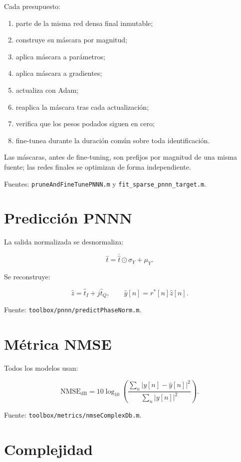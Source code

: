 \documentclass[10pt,a4paper]{article}
\newcommand{\code}[1]{\texttt{#1}}
\begin{document}
Cada presupuesto:

\begin{enumerate}[leftmargin=*]
\item parte de la misma red densa final inmutable;
\item construye su máscara por magnitud;
\item aplica máscara a parámetros;
\item aplica máscara a gradientes;
\item actualiza con Adam;
\item reaplica la máscara tras cada actualización;
\item verifica que los pesos podados siguen en cero;
\item fine-tunea durante la duración común sobre toda identificación.
\end{enumerate}

Las máscaras, antes de fine-tuning, son prefijos por magnitud de una misma
fuente; las redes finales se optimizan de forma independiente.

Fuentes:
\code{pruneAndFineTunePNNN.m} y
\code{fit\_sparse\_pnnn\_target.m}.

\section{Predicción PNNN}

La salida normalizada se desnormaliza:

\[
\hat t=\bar{\hat t}\odot\sigma_Y+\mu_Y.
\]

Se reconstruye:

\[
\hat z=\hat t_I+j\hat t_Q,
\qquad
\hat y[n]=r^*[n]\hat z[n].
\]

Fuente: \code{toolbox/pnnn/predictPhaseNorm.m}.

\section{Métrica NMSE}

Todos los modelos usan:

\[
\mathrm{NMSE}_{\mathrm{dB}}
=10\log_{10}
\left(
\frac{\sum_n|y[n]-\hat y[n]|^2}
{\sum_n|y[n]|^2}
\right).
\]

Fuente: \code{toolbox/metrics/nmseComplexDb.m}.

\section{Complejidad}
\end{document}
